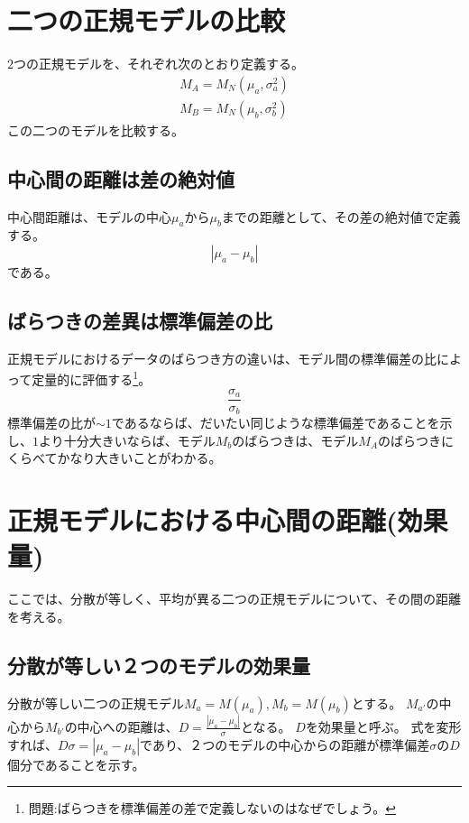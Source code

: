
\section{二つの正規モデルの比較}
$2$つの正規モデルを、それぞれ次のとおり定義する。
\begin{eqnarray*}
 M_A = M_N(\mu_a,\sigma_a^2) \\
 M_B = M_N(\mu_b,\sigma_b^2)
\end{eqnarray*}
この二つのモデルを比較する。

\subsection{中心間の距離は差の絶対値}
中心間距離は、モデルの中心$\mu_a$から$\mu_b$までの距離として、その差の絶対値で定義する。
\begin{equation*}
 |\mu_a - \mu_b|
\end{equation*}
である。

\subsection{ばらつきの差異は標準偏差の比}
正規モデルにおけるデータのばらつき方の違いは、モデル間の標準偏差の比によって定量的に評価する\footnote{問題:ばらつきを標準偏差の差で定義しないのはなぜでしょう。}。
\begin{equation*}
 \frac{\sigma_a}{\sigma_b}
\end{equation*}
標準偏差の比が$\sim 1$であるならば、だいたい同じような標準偏差であることを示し、$1$より十分大きいならば、モデル$M_b$のばらつきは、モデル$M_A$のばらつきにくらべてかなり大きいことがわかる。

\section{正規モデルにおける中心間の距離(効果量)}
ここでは、分散が等しく、平均が異る二つの正規モデルについて、その間の距離を考える。

\subsection{分散が等しい２つのモデルの効果量}
分散が等しい二つの正規モデル$M_a=M(\mu_a),M_b=M(\mu_b)$とする。
$M_{a'}$の中心から$M_{b'}$の中心への距離は、$D=\frac{|\mu_a-\mu_b|}{\sigma}$となる。
$D$を効果量と呼ぶ。
式を変形すれば、$D\sigma = |\mu_a-\mu_b|$であり、２つのモデルの中心からの距離が標準偏差$\sigma$の$D$個分であることを示す。


